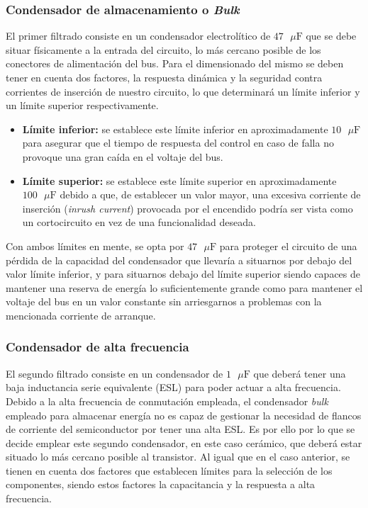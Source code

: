 \documentclass[12pt]{report} %
\begin{document}
\subsubsection{Condensador de almacenamiento o \textit{Bulk}}
El primer filtrado consiste en un condensador electrolítico de $47\text{ }\mu\text{F}$ que se debe situar físicamente a la entrada del circuito, lo más cercano posible de los conectores de alimentación del bus. Para el dimensionado del mismo se deben tener en cuenta dos factores, la respuesta dinámica y la seguridad contra corrientes de inserción de nuestro circuito, lo que determinará un límite inferior y un límite superior respectivamente. 
\begin{itemize}
    \item \textbf{Límite inferior:} se establece este límite inferior en aproximadamente $10\text{ }\mu\text{F}$ para asegurar que el tiempo de respuesta del control en caso de falla no provoque una gran caída en el voltaje del bus.
    \item \textbf{Límite superior:} se establece este límite superior en aproximadamente $100\text{ }\mu\text{F}$ debido a que, de establecer un valor mayor, una excesiva corriente de inserción (\textit{inrush current}) provocada por el encendido podría ser vista como un cortocircuito en vez de una funcionalidad deseada. 
\end{itemize}
Con ambos límites en mente, se opta por $47\text{ }\mu\text{F}$ para proteger el circuito de una pérdida de la capacidad del condensador que llevaría a situarnos por debajo del valor límite inferior, y para situarnos debajo del límite superior siendo capaces de mantener una reserva de energía lo suficientemente grande como para mantener el voltaje del bus en un valor constante sin arriesgarnos a problemas con la mencionada corriente de arranque. 

\subsubsection{Condensador de alta frecuencia}
El segundo filtrado consiste en un condensador de $1\text{ }\mu\text{F}$ que deberá tener una baja inductancia serie equivalente (ESL) para poder actuar a alta frecuencia. Debido a la alta frecuencia de conmutación empleada, el condensador \textit{bulk} empleado para almacenar energía no es capaz de gestionar la necesidad de flancos de corriente del semiconductor por tener una alta ESL. Es por ello por lo que se decide emplear este segundo condensador, en este caso cerámico, que deberá estar situado lo más cercano posible al transistor. Al igual que en el caso anterior, se tienen en cuenta dos factores que establecen límites para la selección de los componentes, siendo estos factores la capacitancia y la respuesta a alta frecuencia.
\end{document}
